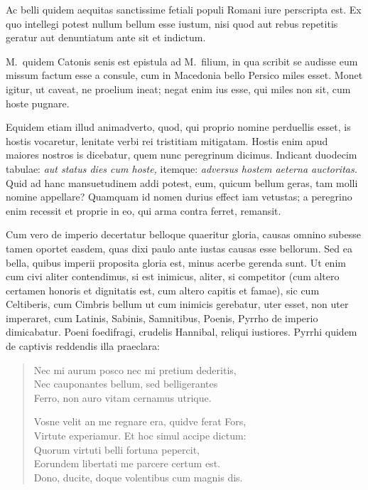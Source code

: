  

 Ac belli quidem aequitas sanctissime fetiali populi Romani iure perscripta est. Ex quo intellegi potest nullum bellum esse iustum, nisi quod aut rebus repetitis geratur aut denuntiatum ante sit et indictum.

 M.~quidem Catonis senis est epistula ad M.~filium, in qua scribit se audisse eum missum factum esse a consule, cum in Macedonia bello Persico miles esset. Monet igitur, ut caveat, ne proelium ineat; negat enim ius esse, qui miles non sit, cum hoste pugnare.

Equidem etiam illud animadverto, quod, qui proprio nomine perduellis esset, is hostis vocaretur, lenitate verbi rei tristitiam mitigatam. Hostis enim apud maiores nostros is dicebatur, quem nunc peregrinum dicimus. Indicant duodecim tabulae: \textit{aut status dies cum hoste,} itemque: \textit{adversus hostem aeterna auctoritas.} Quid ad hanc mansuetudinem addi potest, eum, quicum bellum geras, tam molli nomine appellare? Quamquam id nomen durius effect iam vetustas; a peregrino enim recessit et proprie in eo, qui arma contra ferret, remansit.

 

 Cum vero de imperio decertatur belloque quaeritur gloria, causas omnino subesse tamen oportet easdem, quas dixi paulo ante iustas causas esse bellorum. Sed ea bella, quibus imperii proposita gloria est, minus acerbe gerenda sunt. Ut enim cum civi aliter contendimus, si est inimicus, aliter, si competitor (cum altero certamen honoris et dignitatis est, cum altero capitis et famae), sic cum Celtiberis, cum Cimbris bellum ut cum inimicis gerebatur, uter esset, non uter imperaret, cum Latinis, Sabinis, Samnitibus, Poenis, Pyrrho de imperio dimicabatur. Poeni foedifragi, crudelis Hannibal, reliqui iustiores. Pyrrhi quidem de captivis reddendis illa praeclara:
\begin{verse}
Nec mi aurum posco nec mi pretium dederitis,\\
Nec cauponantes bellum, sed belligerantes\\
Ferro, non auro vitam cernamus utrique.

Vosne velit an me regnare era, quidve ferat Fors,\\
Virtute experiamur. Et hoc simul accipe dictum:\\
Quorum virtuti belli fortuna pepercit,\\
Eorundem libertati me parcere certum est.\\
Dono, ducite, doque volentibus cum magnis dis.
\end{verse}

